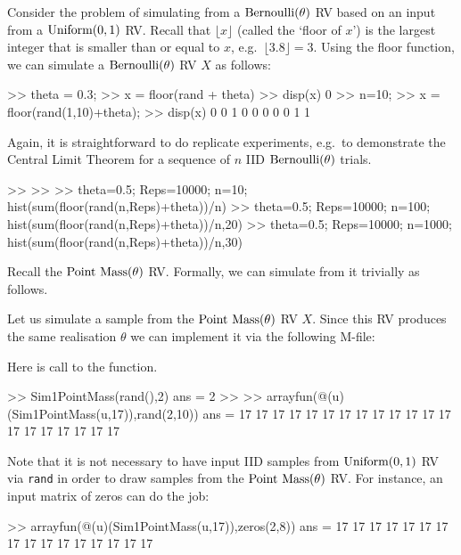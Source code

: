 \begin{simulation}[$\bernoulli(\theta)$]\label{SIM:Bernoulli}
Consider the problem of simulating from a $\bernoulli(\theta)$ RV based on an input from  a $\mbox{{\rm Uniform}}(0,1)$ RV.  Recall that $\lfloor x \rfloor$ (called the `floor of $x$') is the largest integer that is smaller than or equal to $x$, e.g.~$\lfloor 3.8 \rfloor = 3$.  Using the floor function, we can simulate a $\bernoulli(\theta)$ RV $X$ as follows:
\begin{VrbM}
>>  theta = 0.3;		%
>> x = floor(rand + theta)	%
>> disp(x) %
     0
>> n=10;  %
>> x = floor(rand(1,10)+theta); %
>> disp(x) %
     0     0     1     0     0     0     0     0     1     1
\end{VrbM}
\end{simulation}
Again, it is straightforward to do replicate experiments, e.g.~to demonstrate the Central Limit Theorem for a sequence of $n$ IID $\bernoulli(\theta)$ trials.
\begin{VrbM}
>> %
>> %
>> theta=0.5; Reps=10000; n=10; hist(sum(floor(rand(n,Reps)+theta))/n)
>> theta=0.5; Reps=10000; n=100; hist(sum(floor(rand(n,Reps)+theta))/n,20)
>> theta=0.5; Reps=10000; n=1000; hist(sum(floor(rand(n,Reps)+theta))/n,30)
\end{VrbM}

Recall the $\pointmass(\theta)$ RV. Formally, we can simulate from it trivially as follows.
\begin{simulation}[$\pointmass(\theta)$]\label{SIM:PointMass}
Let us simulate a sample from the $\pointmass(\theta)$ RV $X$.  Since this RV produces the same realisation $\theta$ we can implement it via the following M-file:

Here is call to the function.
\begin{VrbM}
>> Sim1PointMass(rand(),2)
ans =     2
>> %
>> arrayfun(@(u)(Sim1PointMass(u,17)),rand(2,10))
ans =
    17    17    17    17    17    17    17    17    17    17
    17    17    17    17    17    17    17    17    17    17
\end{VrbM}
Note that it is not necessary to have input IID samples from $\mbox{{\rm Uniform}}(0,1)$ RV via {\tt rand} in order to draw samples from the $\pointmass(\theta)$ RV.  For instance, an input matrix of zeros can do the job:
\begin{VrbM}
>> arrayfun(@(u)(Sim1PointMass(u,17)),zeros(2,8))
ans =
    17    17    17    17    17    17    17    17
    17    17    17    17    17    17    17    17
\end{VrbM}
\end{simulation}


